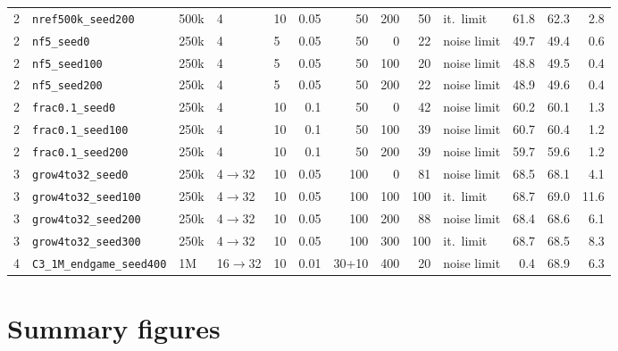 \documentclass[10pt]{article}
\begin{document}
{\begin{longtable}{rllllrrrrlrrr}
2 & \texttt{nref500k\_seed200} & 500k & 4 & 10 & 0.05 & 50 & 200 & 50 & it.\ limit & 61.8 & 62.3 & 2.8 \\
2 & \texttt{nf5\_seed0} & 250k & 4 & 5 & 0.05 & 50 & 0 & 22 & noise limit & 49.7 & 49.4 & 0.6 \\
2 & \texttt{nf5\_seed100} & 250k & 4 & 5 & 0.05 & 50 & 100 & 20 & noise limit & 48.8 & 49.5 & 0.4 \\
2 & \texttt{nf5\_seed200} & 250k & 4 & 5 & 0.05 & 50 & 200 & 22 & noise limit & 48.9 & 49.6 & 0.4 \\
2 & \texttt{frac0.1\_seed0} & 250k & 4 & 10 & 0.1 & 50 & 0 & 42 & noise limit & 60.2 & 60.1 & 1.3 \\
2 & \texttt{frac0.1\_seed100} & 250k & 4 & 10 & 0.1 & 50 & 100 & 39 & noise limit & 60.7 & 60.4 & 1.2 \\
2 & \texttt{frac0.1\_seed200} & 250k & 4 & 10 & 0.1 & 50 & 200 & 39 & noise limit & 59.7 & 59.6 & 1.2 \\
3 & \texttt{grow4to32\_seed0} & 250k & 4$\to$32 & 10 & 0.05 & 100 & 0 & 81 & noise limit & 68.5 & 68.1 & 4.1 \\
3 & \texttt{grow4to32\_seed100} & 250k & 4$\to$32 & 10 & 0.05 & 100 & 100 & 100 & it.\ limit & 68.7 & 69.0 & 11.6 \\
3 & \texttt{grow4to32\_seed200} & 250k & 4$\to$32 & 10 & 0.05 & 100 & 200 & 88 & noise limit & 68.4 & 68.6 & 6.1 \\
3 & \texttt{grow4to32\_seed300} & 250k & 4$\to$32 & 10 & 0.05 & 100 & 300 & 100 & it.\ limit & 68.7 & 68.5 & 8.3 \\
4 & \texttt{C3\_1M\_endgame\_seed400} & 1M & 16$\to$32 & 10 & 0.01 & 30+10 & 400 & 20 & noise limit & 0.4 & 68.9 & 6.3 \\
\end{longtable}}


\clearpage\section{Summary figures}\label{sec:figs}
\end{document}
